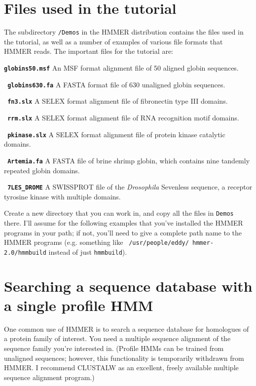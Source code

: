\documentclass[11pt]{report}
\newenvironment{wideitem}{\begin{list} 
     {}
     { \setlength{\labelwidth}{2in}\setlength{\leftmargin}{1.5in}}}
     {\end{list}}
\newcommand{\prog}[1]{\texttt{#1}}
\newcommand{\emprog}[1]{{\bfseries\texttt{#1}}}
\begin{document}
\section{Files used in the tutorial}

The subdirectory \prog{/Demos} in the HMMER distribution contains the
files used in the tutorial, as well as a number of examples of various
file formats that HMMER reads. The important files for the tutorial
are:

\begin{wideitem}
\item[\emprog{globins50.msf}] An MSF format alignment file of 50 aligned globin sequences.
\item[\emprog{ globins630.fa}] A FASTA format file of 630 unaligned globin sequences.
\item[\emprog{ fn3.slx}] A SELEX format alignment file of fibronectin type III domains.
\item[\emprog{ rrm.slx}] A SELEX format alignment file of RNA recognition
motif domains.
\item[\emprog{ pkinase.slx}] A SELEX format alignment file of protein kinase
catalytic domains.
\item[\emprog{ Artemia.fa}] A FASTA file of brine shrimp globin, which contains
nine tandemly repeated globin domains.
\item[\emprog{ 7LES\_DROME}] A SWISSPROT file of the {\em Drosophila} 
Sevenless sequence, a receptor tyrosine kinase with multiple domains.
\end{wideitem}

Create a new directory that you can work in, and copy all the files in
\prog{Demos} there. I'll assume for the following examples that you've
installed the HMMER programs in your path; if not, you'll need to give
a complete path name to the HMMER programs (e.g. something like \prog{
/usr/people/eddy/ hmmer-2.0/hmmbuild} instead of just \prog{hmmbuild}).

\section{Searching a sequence database with a single profile HMM}

One common use of HMMER is to search a sequence database for
homologues of a protein family of interest. You need a multiple
sequence alignment of the sequence family you're interested in.
(Profile HMMs can be trained from unaligned sequences; however, this
functionality is temporarily withdrawn from HMMER. I recommend
CLUSTALW as an excellent, freely available multiple sequence alignment
program.)
\end{document}
